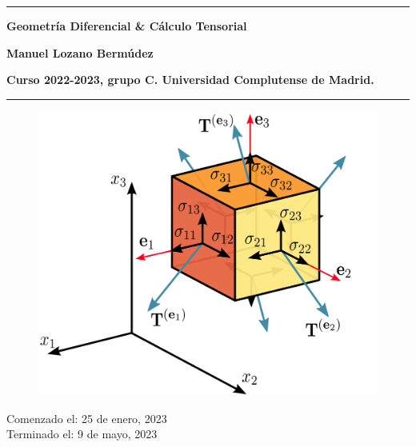 \begin{titlepage}
   \raggedright
       \vspace*{1cm}
       \noindent\rule{\textwidth}{0.5pt}
        \Huge
       \textbf{Geometría Diferencial \& Cálculo Tensorial}
       
        \Large
       \vspace{0.5cm}
       \textbf{Manuel Lozano Bermúdez}

       \large
       \vspace{0.5 cm}
       \textbf{Curso 2022-2023, grupo C. Universidad Complutense de Madrid.}
       \noindent\rule{\textwidth}{0.5pt}
        \vspace{1.5 cm}
       \begin{figure}[h]
           \centering
           \includegraphics[scale=.3]{FOTOS/portada_def.png}
           \label{fig:portada}
       \end{figure}

        \vspace*{\fill}
        
         \Large
         Comenzado el: 25 de enero, 2023\\
         Terminado el: 9 de mayo, 2023


\end{titlepage}
